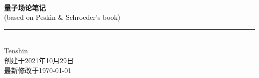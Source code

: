 \documentclass[10pt,b5paper,openany]{book} %
\newcommand{\HRule}{\rule{\linewidth}{0.5mm}}
\begin{document}
\begin{titlepage}
  \centering

  \mbox{} \\[-0.3cm]

  {\bfseries \fontsize{32pt}{1pt} 量子场论笔记} \\[0.2cm]

  (\large based on Peskin \& Schroeder's book) \\[0.8cm]

  \HRule \\[0.8cm]

  {\Large Tenshin} \\[0.3cm]

  {\small 创建于2021年10月29日} \\[-0.1cm]
  
  {\small 最新修改于\today} \\[0.4cm]

\end{titlepage}

\setcounter{page}{1}


\tableofcontents
{}
\clearpage
\end{document}
